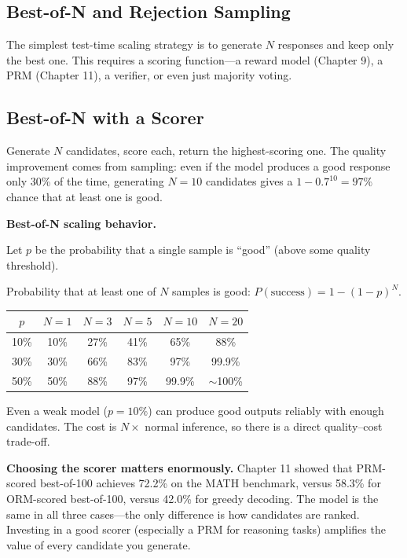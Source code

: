 \begin{chapterenv}
\section{Best-of-N and Rejection Sampling}

The simplest test-time scaling strategy is to generate $N$ responses and keep only the best one. This requires a scoring function---a reward model (Chapter 9), a PRM (Chapter 11), a verifier, or even just majority voting.

\subsection{Best-of-N with a Scorer}

Generate $N$ candidates, score each, return the highest-scoring one. The quality improvement comes from sampling: even if the model produces a good response only 30\% of the time, generating $N = 10$ candidates gives a $1 - 0.7^{10} = 97\%$ chance that at least one is good.

\begin{infobox}
\textbf{Best-of-N scaling behavior.}

Let $p$ be the probability that a single sample is ``good'' (above some quality threshold).

Probability that at least one of $N$ samples is good: $P(\text{success}) = 1 - (1-p)^N$.

\begin{tabular}{cccccc}
\toprule
$p$ & $N=1$ & $N=3$ & $N=5$ & $N=10$ & $N=20$ \\
\midrule
10\% & 10\% & 27\% & 41\% & 65\% & 88\% \\
30\% & 30\% & 66\% & 83\% & 97\% & 99.9\% \\
50\% & 50\% & 88\% & 97\% & 99.9\% & $\sim$100\% \\
\bottomrule
\end{tabular}

Even a weak model ($p = 10\%$) can produce good outputs reliably with enough candidates. The cost is $N \times$ normal inference, so there is a direct quality--cost trade-off.
\end{infobox}

\textbf{Choosing the scorer matters enormously.} Chapter 11 showed that PRM-scored best-of-100 achieves 72.2\% on the MATH benchmark, versus 58.3\% for ORM-scored best-of-100, versus 42.0\% for greedy decoding. The model is the same in all three cases---the only difference is how candidates are ranked. Investing in a good scorer (especially a PRM for reasoning tasks) amplifies the value of every candidate you generate.


\end{chapterenv}
